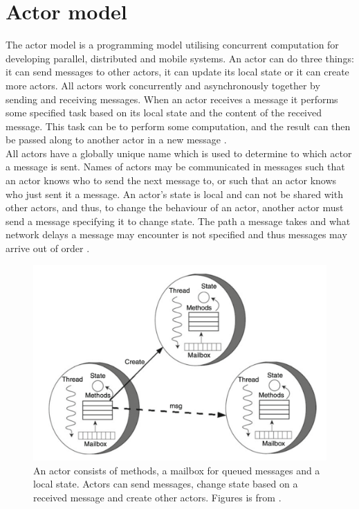 \section{Actor model}
The actor model is a programming model utilising concurrent computation for developing parallel, distributed and mobile systems. An actor can do three things: it can send messages to other actors, it can update its local state or it can create more actors. All actors work concurrently and asynchronously together by sending and receiving messages. When an actor receives a message it performs some specified task based on its local state and the content of the received message. This task can be to perform some computation, and the result can then be passed along to another actor in a new message \cite{ActorModelPaper}.\\
All actors have a globally unique name which is used to determine to which actor a message is sent. Names of actors may be communicated in messages such that an actor knows who to send the next message to, or such that an actor knows who just sent it a message. An actor's state is local and can not be shared with other actors, and thus, to change the behaviour of an actor, another actor must send a message specifying it to change state. The path a message takes and what network delays a message may encounter is not specified and thus messages may arrive out of order \cite{ActorModelPaper}.\\
\begin{figure}[H]
	\centering
	\includegraphics[width=0.85\linewidth]{Materials/ActorModel/AMDemonstrated}
	\caption{An actor consists of methods, a mailbox for queued messages and a local state. Actors can send messages, change state based on a received message and create other actors. Figures is from \cite{ActorModelPaper}.}
	\label{AMDemonstrated}
\end{figure}
